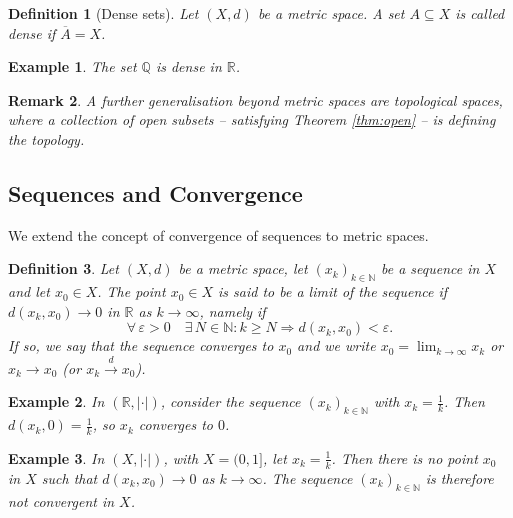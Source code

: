 \documentclass[a4paper,reqno]{amsart}
\numberwithin{equation}{section}
\newtheorem{definition}{Definition}[section]
\newtheorem{remark}[definition]{Remark}
\newtheorem{example}{Example}
\def\N{\mathbb{N}}
\def\Q{\mathbb{Q}}
\def\R{\mathbb{R}}
\begin{document}
\begin{definition}[Dense sets]
Let $(X,d)$ be a metric space. A set $A \subseteq X$ is called \emph{dense} 
if $\overline{A} = X$.
\end{definition}

\begin{example}
The set $\Q$ is dense in $\R$.
\end{example}



\begin{remark} A further generalisation beyond metric spaces are topological spaces, where a collection of open subsets -- satisfying Theorem
\ref{thm:open} -- is defining the topology.
\end{remark}


%
%


\bigskip




\subsection{Sequences and Convergence}

We extend the concept of convergence of sequences to metric spaces.

\begin{definition}
Let $(X,d)$ be a metric space, let $(x_k)_{k \in \N}$ be a sequence in $X$ and let $x_0\in X$. The point
$x_0 \in X$ is said to be a \emph{limit} of the sequence if $d(x_k,x_0) \to 0$
in $\R$ as $k \to \infty$, namely if
$$
\forall \, \varepsilon>0 \quad \exists \,N\in \N: k\geq N \Rightarrow d(x_k,x_0)<\varepsilon.
$$
If so, we say that the sequence \emph{converges} to
$x_0$ and we write $x_0 = \lim_{k \to \infty} x_k$ or $x_k \to x_0$ (or $x_k \stackrel{d}{\to} x_0$).
\end{definition}




\begin{example}
In $(\R, |\cdot|)$, consider the sequence $(x_k)_{k \in \N}$
with $x_k = \frac{1}{k}$. Then $d(x_k,0) = \frac{1}{k}$, so $x_k$
converges to $0$.
\end{example}

\begin{example}
In $(X,|\cdot|)$, with $X = (0,1]$, let $x_k = \frac{1}{k}$. Then there is no point $x_0$ in $X$ such that
$d(x_k,x_0) \to 0$ as $k \to \infty$. The sequence $(x_k)_{k \in \N}$
is therefore not convergent in $X$.
\end{example}
\end{document}
